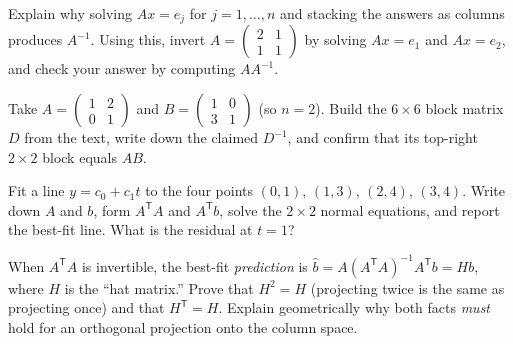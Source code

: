 \begin{exercise}
\label{ch27:ex-inverse}
Explain why solving $Ax=e_j$ for $j=1,\dots,n$ and stacking the answers as columns
produces $A^{-1}$. Using this, invert
$A=\begin{pmatrix}2 & 1\\ 1 & 1\end{pmatrix}$ by solving $Ax=e_1$ and $Ax=e_2$, and
check your answer by computing $AA^{-1}$.
\end{exercise}

\begin{exercise}
\label{ch27:ex-equivalence}
Take $A=\begin{pmatrix}1&2\\0&1\end{pmatrix}$ and $B=\begin{pmatrix}1&0\\3&1\end{pmatrix}$
(so $n=2$). Build the $6\times 6$ block matrix $D$ from the text, write down the
claimed $D^{-1}$, and confirm that its top-right $2\times2$ block equals $AB$.
\end{exercise}

\begin{exercise}
\label{ch27:ex-lsq}
Fit a line $y=c_0+c_1 t$ to the four points $(0,1)$, $(1,3)$, $(2,4)$, $(3,4)$.
Write down $A$ and $b$, form $A^{\mathsf T}A$ and $A^{\mathsf T}b$, solve the
$2\times2$ normal equations, and report the best-fit line. What is the residual
at $t=1$?
\end{exercise}

\begin{exercise}
\label{ch27:ex-projection}
When $A^{\mathsf T}A$ is invertible, the best-fit \emph{prediction} is
$\hat b = A(A^{\mathsf T}A)^{-1}A^{\mathsf T}b = Hb$, where $H$ is the
``hat matrix.'' Prove that $H^2=H$ (projecting twice is the same as projecting
once) and that $H^{\mathsf T}=H$. Explain geometrically why both facts \emph{must}
hold for an orthogonal projection onto the column space.
\end{exercise}
